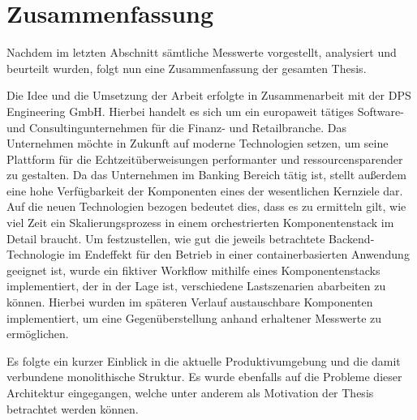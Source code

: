 \chapter{Zusammenfassung}

Nachdem im letzten Abschnitt sämtliche Messwerte vorgestellt, analysiert und beurteilt wurden, folgt nun eine Zusammenfassung der gesamten Thesis.

Die Idee und die Umsetzung der Arbeit erfolgte in Zusammenarbeit mit der DPS Engineering
GmbH. Hierbei handelt es sich um ein europaweit tätiges Software- und Consultingunternehmen für
die Finanz- und Retailbranche. Das Unternehmen möchte in Zukunft auf moderne Technologien setzen, um seine Plattform für die Echtzeitüberweisungen performanter und ressourcensparender zu gestalten. Da das Unternehmen im Banking Bereich tätig ist, stellt außerdem eine hohe Verfügbarkeit der Komponenten
eines der wesentlichen Kernziele dar. Auf die neuen Technologien bezogen bedeutet dies, dass es zu
ermitteln gilt, wie viel Zeit ein Skalierungsprozess in einem orchestrierten Komponentenstack im
Detail braucht. Um festzustellen, wie gut die jeweils betrachtete Backend-Technologie im Endeffekt für den Betrieb in einer containerbasierten Anwendung geeignet ist, wurde ein fiktiver Workflow mithilfe eines Komponentenstacks implementiert, der in der Lage ist, verschiedene Lastszenarien abarbeiten zu können. Hierbei wurden im späteren Verlauf austauschbare Komponenten implementiert, um eine Gegenüberstellung anhand erhaltener Messwerte zu ermöglichen.

Es folgte ein kurzer Einblick in die aktuelle Produktivumgebung und die damit verbundene monolithische Struktur. Es wurde ebenfalls auf die Probleme dieser Architektur eingegangen, welche unter anderem als Motivation der Thesis betrachtet werden können.

